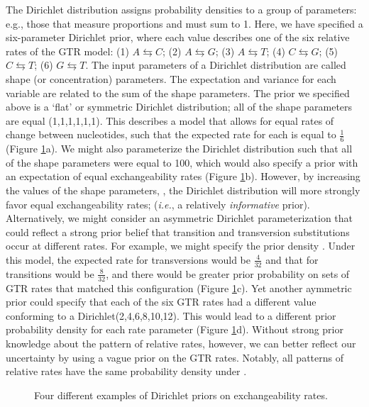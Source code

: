 The Dirichlet distribution assigns probability densities to a group of parameters: e.g., those that measure proportions and must sum to 1. 
Here, we have specified a six-parameter Dirichlet prior, where each value describes one of the six relative rates of the GTR model: 
(1) $A\leftrightarrows C$; (2) $A\leftrightarrows G$; (3) $A\leftrightarrows T$; (4) $C\leftrightarrows G$; (5) $C\leftrightarrows T$; (6) $G\leftrightarrows T$. 
The input parameters of a Dirichlet distribution are called shape (or concentration) parameters. 
The expectation and variance for each variable are related to the sum of the shape parameters.
The prior we specified above is a `flat' or symmetric Dirichlet distribution; all of the shape parameters are equal (1,1,1,1,1,1).
This describes a model that allows for equal rates of change between nucleotides, such that the expected rate for each is equal to $\frac{1}{6}$ (Figure \ref{dirichletFig}a).
We might also parameterize the Dirichlet distribution such that all of the shape parameters were equal to 100, which would also specify a prior with an expectation of equal exchangeability rates (Figure \ref{dirichletFig}b). 
However, by increasing the values of the shape parameters, , the Dirichlet distribution will more strongly favor equal exchangeability rates; ({\it i.e.}, a relatively {\em informative} prior).
Alternatively, we might consider an asymmetric Dirichlet parameterization that could reflect a strong prior belief that transition and transversion substitutions occur at different rates.
For example, we might specify the prior density .   
Under this model, the expected rate for transversions would be $\frac{4}{32}$ and that for transitions would be $\frac{8}{32}$, and there would be greater prior probability on sets of GTR rates that matched this configuration (Figure \ref{dirichletFig}c). 
Yet another aymmetric prior could specify that each of the six GTR rates had a different value conforming to a Dirichlet(2,4,6,8,10,12). 
This would lead to a different prior probability density for each rate parameter (Figure \ref{dirichletFig}d).
Without strong prior knowledge about the pattern of relative rates, however, we can better reflect our uncertainty by using a vague prior on the GTR rates. 
Notably, all patterns of relative rates have the same probability density under .
\begin{figure}[h!]
\centering
{}
\caption{\small Four different examples of Dirichlet priors on exchangeability rates.}
\label{dirichletFig}
\end{figure}


